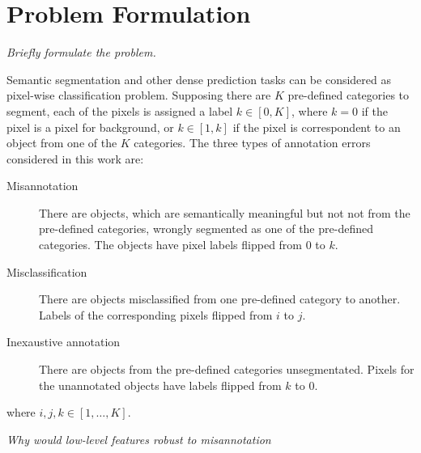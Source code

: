 \section{Problem Formulation}
\label{sec:formulation}

\noindent
\textit{Briefly formulate the problem.}

\noindent
Semantic segmentation and other dense prediction tasks can be considered as pixel-wise classification problem.
Supposing there are $K$ pre-defined categories to segment, each of the pixels is assigned a label $k \in [0, K]$, where $k=0$ if the pixel is a pixel for background, or $k \in [1, k]$ if the pixel is correspondent to an object from one of the $K$ categories.
The three types of annotation errors considered in this work are:
\begin{description}
  \item [Misannotation] There are objects, which are semantically meaningful but not not from the pre-defined categories, wrongly segmented as one of the pre-defined categories. The objects have pixel labels flipped from $0$ to $k$.
  \item [Misclassification] There are objects misclassified from one pre-defined category to another. Labels of the corresponding pixels flipped from $i$ to $j$.
  \item [Inexaustive annotation] There are objects from the pre-defined categories unsegmentated. Pixels for the unannotated objects have labels flipped from $k$ to $0$.
\end{description}
where $i, j, k \in [1, \ldots, K]$.

\noindent
\textit{Why would low-level features robust to misannotation}
\noindent
